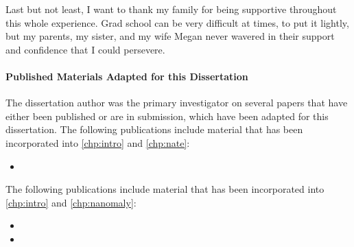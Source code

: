 \begin{acknowledgements}
  Last but not least, I want to thank my family for being supportive
  throughout this whole experience. Grad school can be very difficult at
  times, to put it lightly, but my parents, my sister, and my wife Megan
  never wavered in their support and confidence that I could persevere.

  \paragraph{Published Materials Adapted for this Dissertation}
  The dissertation author was the primary investigator on several papers
  that have either been published or are in submission, which have been
  adapted for this dissertation.
  The following publications include material that has been incorporated
  into \autoref{chp:intro} and \autoref{chp:nate}:
  \begin{itemize}
  \item {}
  \end{itemize}
  The following publications include material that has been incorporated
  into \autoref{chp:intro} and \autoref{chp:nanomaly}:
  \begin{itemize}
  \item {}
  \item {}
  \end{itemize}
\end{acknowledgements}



